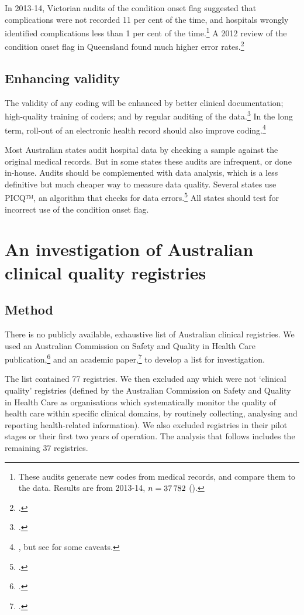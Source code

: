 \documentclass[FrontPage]{grattan}
\begin{document}
In 2013-14, Victorian audits of the condition onset flag suggested that complications were not recorded 11 per cent of the time, and hospitals wrongly identified complications less than 1 per cent of the time.\footnote{These audits generate new codes from medical records, and compare them to the data. Results are from 2013-14, \(n = \text{37\,782}\) (\textcite{shepheard2015}).}
A 2012 review of the condition onset flag in Queensland found much higher error rates.\footcite{RN116}

\section{Enhancing validity}
The validity of any coding will be enhanced by better clinical documentation; high-quality training of coders; and by regular auditing of the data.\footcite{RN1}
In the long term, roll-out of an electronic health record should also improve coding.\footnote{\textcite{RN117}, but see \textcites{RN119}{RN118} for some caveats.}

Most Australian states audit hospital data by checking a sample against the original medical records. But in some states these audits are infrequent, or done in-house. Audits should be complemented with data analysis, which is a less definitive but much cheaper way to measure data quality. Several states use PICQ™, an algorithm that checks for data errors.\footcite{RN120} All states should test for incorrect use of the condition onset flag.


\chapter{An investigation of Australian clinical quality registries}\label{chap:ausregistries}
\section{Method}
There is no publicly available, exhaustive list of Australian clinical registries. We used an Australian Commission on Safety and Quality in Health Care publication,\footcite{RN121}
and an academic paper,\footcite{RN30} to develop a list for investigation.

The list contained 77 registries. We then excluded any which were not ‘clinical quality’ registries (defined by the Australian Commission on Safety and Quality in Health Care as organisations which systematically monitor the quality of health care within specific clinical domains, by routinely collecting, analysing and reporting health-related information). We also excluded registries in their pilot stages or their first two years of operation. The analysis that follows includes the remaining 37 registries.
\end{document}
